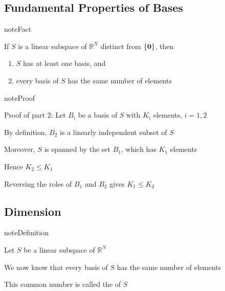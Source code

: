 \documentclass[letterpaper,10pt,english]{jupyterBook}
\begin{document}
\subsection{Fundamental Properties of Bases}
\label{\detokenize{05.linear_algebra:fundamental-properties-of-bases}}
\begin{sphinxadmonition}{note}{Fact}

\sphinxAtStartPar
If \(S\) is a linear subspace of \(\mathbb{R}^N\) distinct from \(\{{\bf 0}\}\), then
\begin{enumerate}
%
\item {} 
\sphinxAtStartPar
\(S\) has at least one basis, and

\item {} 
\sphinxAtStartPar
every basis of \(S\) has the same number of elements

\end{enumerate}
\end{sphinxadmonition}

\begin{sphinxadmonition}{note}{Proof}

\sphinxAtStartPar
Proof of part 2: Let \(B_i\) be a basis of \(S\) with \(K_i\) elements, \(i=1, 2\)

\sphinxAtStartPar
By definition, \(B_2\) is a linearly independent subset of \(S\)

\sphinxAtStartPar
Moreover, \(S\) is spanned by the set \(B_1\), which has \(K_1\) elements

\sphinxAtStartPar
Hence \(K_2 \leq K_1\)

\sphinxAtStartPar
Reversing the roles of \(B_1\) and \(B_2\) gives \(K_1 \leq K_2\)
\end{sphinxadmonition}


\subsection{Dimension}
\label{\detokenize{05.linear_algebra:dimension}}
\begin{sphinxadmonition}{note}{Definition}

\sphinxAtStartPar
Let \(S\) be a linear subspace of \(\mathbb{R}^N\)

\sphinxAtStartPar
We now know that every basis of \(S\) has the same number of elements

\sphinxAtStartPar
This common number is called the  of \(S\)
\end{sphinxadmonition}
\end{document}
